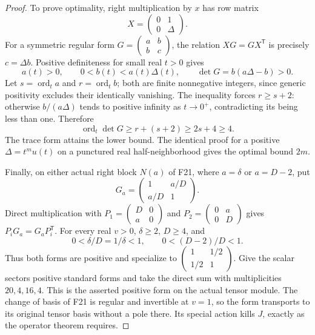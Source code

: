 \documentclass[11pt,a4paper]{article}
\newcommand{\fid}[1]{\textsf{#1}}\newcommand{\gate}[1]{\textsf{#1}}
\theoremstyle{named}\newtheorem{finding}{Finding}[section]
\theoremstyle{definition}\newtheorem{definition}[finding]{Definition}
\theoremstyle{remark}\newtheorem{remark}[finding]{Remark}
\begin{document}
\begin{proof}
To prove optimality, right multiplication by $x$ has row matrix
\[
 X=\begin{pmatrix}0&1\\0&\Delta\end{pmatrix}.
\]
For a symmetric regular form
$G=\left(\begin{smallmatrix}a&b\\b&c\end{smallmatrix}\right)$,
the relation $XG=GX^{\mathsf T}$ is precisely $c=\Delta b$.
Positive definiteness for small real $t>0$ gives
\[
 a(t)>0,\qquad 0<b(t)<a(t)\Delta(t),\qquad
 \det G=b(a\Delta-b)>0.
\]
Let $s=\operatorname{ord}_t a$ and $r=\operatorname{ord}_t b$;
both are finite nonnegative integers, since generic positivity
excludes their identically vanishing. The inequality forces
$r\ge s+2$: otherwise $b/(a\Delta)$ tends to positive infinity
as $t\to0^+$, contradicting its being less than one. Therefore
\[
 \operatorname{ord}_t\det G
 \ge r+(s+2)\ge2s+4\ge4.
\]
The trace form attains the lower bound. The identical proof for a
positive $\Delta=t^m u(t)$ on a punctured real half-neighborhood
gives the optimal bound $2m$.

Finally, on either actual right block $N(a)$ of \fid{F21}, where
$a=\delta$ or $a=D-2$, put
\[
 G_a=\begin{pmatrix}1&a/D\\a/D&1\end{pmatrix}.
\]
Direct multiplication with
$P_1=\left(\begin{smallmatrix}D&0\\a&0\end{smallmatrix}\right)$
and $P_2=\left(\begin{smallmatrix}0&a\\0&D\end{smallmatrix}\right)$
gives $P_iG_a=G_aP_i^{\mathsf T}$. For every real $v>0$,
$\delta\ge2$, $D\ge4$, and
\[
 0<\delta/D=1/\delta<1,\qquad 0<(D-2)/D<1.
\]
Thus both forms are positive and specialize to
$\left(\begin{smallmatrix}1&1/2\\1/2&1\end{smallmatrix}\right)$.
Give the scalar sectors positive standard forms and take the
direct sum with multiplicities $20,4,16,4$. This is the asserted
positive form on the actual tensor module. The change of basis
of \fid{F21} is regular and invertible at $v=1$, so the form
transports to its original tensor basis without a pole there.
Its special action kills $J$, exactly as the operator theorem requires.
\end{proof}
\end{document}
